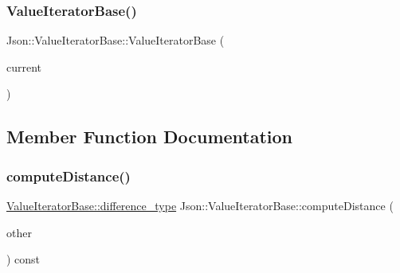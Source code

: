 \mbox{\label{classJson_1_1ValueIteratorBase_a640e990e5f03a96fd650122a2906f59d_a640e990e5f03a96fd650122a2906f59d}} 
\subsubsection{\texorpdfstring{Value\+Iterator\+Base()}{ValueIteratorBase()}\hspace{0.1cm}{\footnotesize\ttfamily [2/2]}}
{\footnotesize\ttfamily Json\+::\+Value\+Iterator\+Base\+::\+Value\+Iterator\+Base (\begin{DoxyParamCaption}\item[{const Value\+::\+Object\+Values\+::iterator \&}]{current }\end{DoxyParamCaption})\hspace{0.3cm}{\ttfamily [explicit]}}



\subsection{Member Function Documentation}
\mbox{\label{classJson_1_1ValueIteratorBase_af11473c9e20d07782e42b52a2f9e4540_af11473c9e20d07782e42b52a2f9e4540}} 
\subsubsection{\texorpdfstring{compute\+Distance()}{computeDistance()}}
{\footnotesize\ttfamily \hyperlink{classJson_1_1ValueIteratorBase_a4e44bf8cbd17ec8d6e2c185904a15ebd_a4e44bf8cbd17ec8d6e2c185904a15ebd}{Value\+Iterator\+Base\+::difference\+\_\+type} Json\+::\+Value\+Iterator\+Base\+::compute\+Distance (\begin{DoxyParamCaption}\item[{const \hyperlink{classJson_1_1ValueIteratorBase_a9d2a940d03ea06d20d972f41a89149ee_a9d2a940d03ea06d20d972f41a89149ee}{Self\+Type} \&}]{other }\end{DoxyParamCaption}) const\hspace{0.3cm}{\ttfamily [protected]}}



